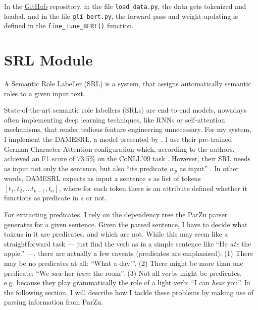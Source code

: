 In the \href{https://github.com/JonathanSchaber/Masterarbeit}{GitHub} repository, in
the file \texttt{load\_data.py}, the data gets tokenized and loaded, and in
the file \texttt{gli\_bert.py}, the forward pass and weight-updating is
defined in the \texttt{fine\_tune\_BERT()} function.


\section{SRL Module}
\label{sec:srl-module}

A Semantic Role Labeller (SRL) is a system, that assigns automatically semantic roles to a
given input text.

State-of-the-art semantic role labellers (SRLs) are end-to-end models, nowadays often
implementing deep learning techniques, like RNNs or self-attention mechanisms, that render
tedious feature engineering unnecessary.  For my system, I implement the DAMESRL, a model
presented by \cite{do2018flexible}.  I use their pre-trained German Character-Attention
configuration which, according to the authors, achieved an F1 score of 73.5\% on the CoNLL'09 task
\citep{hajivc2009conll}.  However, their SRL needs as input not only the sentence, but also
``its predicate $w_p$ as input'' \citep{do2018flexible}. In other words, DAMESRL expects
as input a sentence $s$ as list of tokens $[ t_1, t_2, \dotsc t_{n-1}, t_n ]$, where for each
token there is an attribute defined whether it functions as predicate in $s$ or not.

For extracting predicates, I rely on the dependency tree the ParZu parser
\cite{sennrich2013exploiting} generates for a given sentence. Given the
parsed sentence, I have to decide what tokens in it are predicates, and
which are not. While this may seem like a straightforward task --- just
find the verb as in a simple sentence like ``He \emph{ate} the apple.''
---, there are actually a few caveats (predicates are emphasised): (1)
There may be no predicates at all: ``What a day!''. (2) There might be
more than one predicate: ``We \emph{saw} her \emph{leave} the room''. (3)
Not all verbs might be predicates, e.g. because they play grammatically
the role of a light verb: ``I can \emph{hear} you''. In the following
section, I will describe how I tackle these problems by making use of
parsing information from ParZu.


